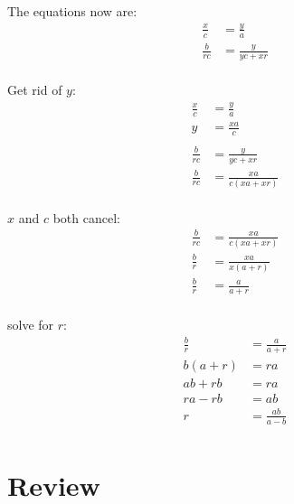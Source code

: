 \documentclass{exam}
\begin{document}
\begin{description}
      The equations now are:
      \begin{align*}
        \frac{x}{c}  & = \frac{y}{a} \\
        \frac{b}{rc} & = \frac{y}{yc + xr} \\
      \end{align*}

      Get rid of $y$:
      \begin{align*}
        \frac{x}{c}  & = \frac{y}{a} \\
        y            & = \frac{xa}{c} \\
        \\
        \frac{b}{rc} & = \frac{y}{yc + xr} \\
        \frac{b}{rc} & = \frac{xa}{c(xa + xr)} \\
      \end{align*}

      $x$ and $c$ both cancel:
      \begin{align*}
        \frac{b}{rc} & = \frac{xa}{c(xa + xr)} \\
        \frac{b}{r} & = \frac{xa}{x(a + r)} \\
        \frac{b}{r}  & = \frac{a}{a + r} \\
      \end{align*}

      solve for $r$:
      \begin{align*}
        \frac{b}{r} & = \frac{a}{a + r} \\
        b(a + r)    & = ra \\
        ab + rb     & = ra \\
        ra - rb     & = ab \\
        r           & = \frac{ab}{a - b} \\
      \end{align*}
  \end{description}

  \fi

  \section{Review}
\end{document}
